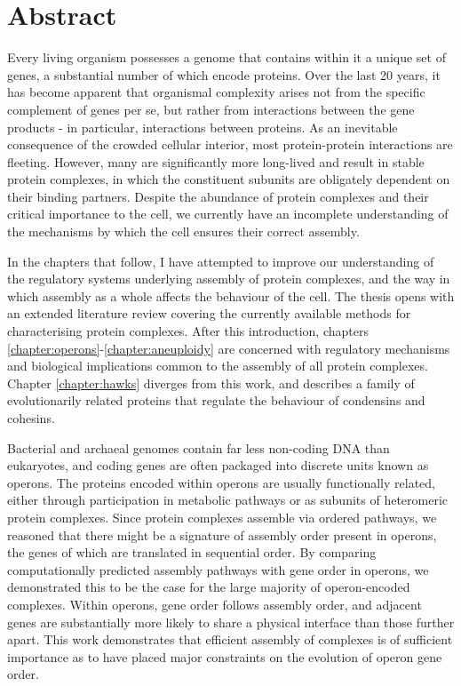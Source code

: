 \documentclass[a4paper,11pt,twoside,openright]{scrbook}
\begin{document}
\chapter*{Abstract}
Every living organism possesses a genome that contains within it a unique set of genes, a substantial number of which encode proteins. Over the last 20 years, it has become apparent that organismal complexity arises not from the specific complement of genes per se, but rather from interactions between the gene products - in particular, interactions between proteins. As an inevitable consequence of the crowded cellular interior, most protein-protein interactions are fleeting. However, many are significantly more long-lived and result in stable protein complexes, in which the constituent subunits are obligately dependent on their binding partners. Despite the abundance of protein complexes and their critical importance to the cell, we currently have an incomplete understanding of the mechanisms by which the cell ensures their correct assembly.

In the chapters that follow, I have attempted to improve our understanding of the regulatory systems underlying assembly of protein complexes, and the way in which assembly as a whole affects the behaviour of the cell. The thesis opens with an extended literature review covering the currently available methods for characterising protein complexes. After this introduction, chapters \ref*{chapter:operons}-\ref*{chapter:aneuploidy} are concerned with regulatory mechanisms and biological implications common to the assembly of all protein complexes. Chapter \ref{chapter:hawks} diverges from this work, and describes a family of evolutionarily related proteins that regulate the behaviour of condensins and cohesins.

Bacterial and archaeal genomes contain far less non-coding DNA than eukaryotes, and coding genes are often packaged into discrete units known as operons. The proteins encoded within operons are usually functionally related, either through participation in metabolic pathways or as subunits of heteromeric protein complexes. Since protein complexes assemble via ordered pathways, we reasoned that there might be a signature of assembly order present in operons, the genes of which are translated in sequential order. By comparing computationally predicted assembly pathways with gene order in operons, we demonstrated this to be the case for the large majority of operon-encoded complexes. Within operons, gene order follows assembly order, and adjacent genes are substantially more likely to share a physical interface than those further apart. This work demonstrates that efficient assembly of complexes is of sufficient importance as to have placed major constraints on the evolution of operon gene order.
\end{document}
